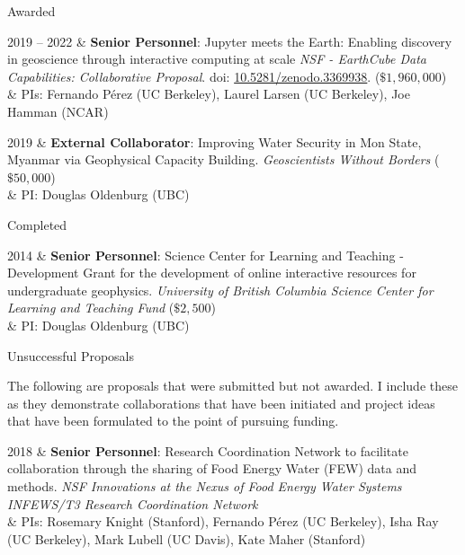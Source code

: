\documentclass[a4paper, 11pt]{article}
\newcommand{\doi}[1]{doi: \href{https://doi.org/#1}{#1}}
\newcommand{\subheading}[1]{
    \vspace{0.4cm}
    {\Large #1}\\
    \vspace{-0.2cm}
}
\begin{document}
\subheading{Awarded}
\begin{entryright}
2019 -- 2022 & \textbf{Senior Personnel}: Jupyter meets the Earth: Enabling discovery in geoscience through interactive computing at scale \emph{NSF - EarthCube Data Capabilities: Collaborative Proposal}. \doi{10.5281/zenodo.3369938}. ($\$1,960,000$) \\
& PIs: Fernando P\'erez (UC Berkeley), Laurel Larsen (UC Berkeley), Joe Hamman (NCAR) \\
\end{entryright}

\begin{entryright}
2019 & \textbf{External Collaborator}: Improving Water Security in Mon State, Myanmar via Geophysical Capacity Building. \emph{Geoscientists Without Borders} ($\$50,000$) \\
& PI: Douglas Oldenburg (UBC) \\
\end{entryright}


\subheading{Completed}
\begin{entryright}
2014 & \textbf{Senior Personnel}: Science Center for Learning and Teaching - Development Grant for the development of online interactive resources for undergraduate geophysics. \emph{University of British Columbia Science Center for Learning and Teaching Fund} ($\$2,500$) \\
& PI: Douglas Oldenburg (UBC) \\
\end{entryright}

\subheading{Unsuccessful Proposals}

\noindent The following are proposals that were submitted but not awarded. I include these as they demonstrate collaborations that have been initiated and project ideas that have been formulated to the point of pursuing funding. \\

\begin{entryright}
2018 & \textbf{Senior Personnel}: Research Coordination Network to facilitate collaboration through the sharing of Food Energy Water (FEW) data and methods. \emph{NSF Innovations at the Nexus of Food Energy Water Systems INFEWS/T3 Research Coordination Network} \\
& PIs: Rosemary Knight (Stanford), Fernando P\'erez (UC Berkeley), Isha Ray (UC Berkeley), Mark Lubell (UC Davis), Kate Maher (Stanford) \\
\end{entryright}
\end{document}
